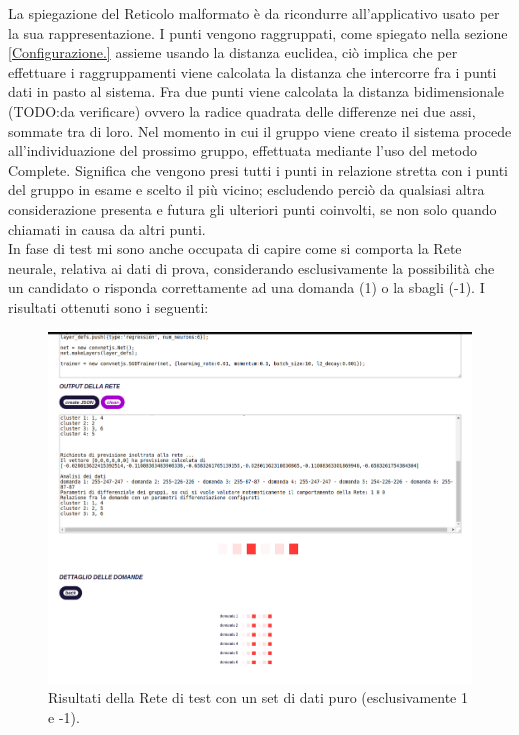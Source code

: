 \noindent
La spiegazione del Reticolo malformato \`e da ricondurre all'applicativo usato per la sua rappresentazione. I punti vengono raggruppati, come spiegato nella sezione \ref{Configurazione.} assieme usando la distanza euclidea, ci\`o implica che per effettuare i raggruppamenti viene calcolata la distanza che intercorre fra i punti dati in pasto al sistema. Fra due punti viene calcolata la distanza bidimensionale (TODO:da verificare) ovvero la radice quadrata delle differenze  nei due assi, sommate tra di loro. Nel momento in cui il gruppo viene creato il sistema procede all'individuazione del prossimo gruppo, effettuata mediante l'uso del metodo Complete. Significa che vengono presi tutti i punti in relazione stretta con i punti del gruppo in esame e scelto il pi\`u vicino; escludendo perci\`o da qualsiasi altra considerazione presenta e futura gli ulteriori punti coinvolti, se non solo quando chiamati in causa da altri punti.\\
\noindent
In fase di test mi sono anche occupata di capire come si comporta la Rete neurale, relativa ai dati di prova, considerando esclusivamente la possibilit\`a che un candidato o risponda correttamente ad una domanda (1) o la sbagli (-1). I risultati ottenuti sono i seguenti:
\begin{figure}[H]
\centering
	\includegraphics[width=1\linewidth]{./image/RetediProva_generatorinputpuro.png}
	\caption{Risultati della Rete di test con un set di dati puro (esclusivamente 1 e -1).}
	\label{Risultati della Rete di test con un set di dati puro (esclusivamente 1 e -1).}
	\end{figure}
